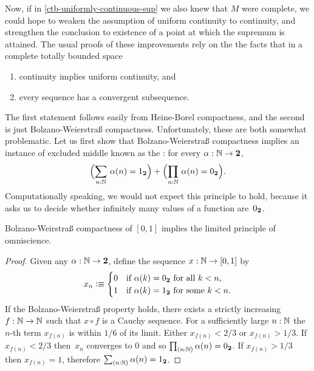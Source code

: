 Now, if in \autoref{ctb-uniformly-continuous-sup} we also knew that $M$ were complete, we
could hope to weaken the assumption of uniform continuity to continuity, and strengthen
the conclusion to existence of a point at which the supremum is attained. The usual proofs
of these improvements rely on the the facts that in a complete totally bounded space
%
\begin{enumerate}
\item continuity implies uniform continuity, and
\item every sequence has a convergent subsequence.
\end{enumerate}
%
The first statement follows easily from Heine-Borel compactness, and the second is just
Bolzano-Weierstra\ss{} compactness.
%
Unfortunately, these are both somewhat problematic. Let
us first show that Bolzano-Weierstra\ss{} compactness implies an instance of excluded middle
known as the :
%
%
for every $\alpha : \mathbb{N} \to \mathbf{2}$,
% 
\begin{equation} \label{eq:lpo}
  \Parens{\sm{n : \N} \alpha(n) = \btrue} +
  \Parens{\prd{n : \N} \alpha(n) = \bfalse}.
\end{equation}
%
Computationally speaking, we would not expect this principle to hold, because it asks us to decide
whether infinitely many values of a function are~${0_{\mathbf{2}}}$.
  
\begin{thm} \label{analysis-bw-lpo}
  Bolzano-Weirstra\ss{} compactness of $[0,1]$ implies the limited principle of omniscience.
\end{thm}

\begin{proof}
  Given any $\alpha : \mathbb{N} \to \mathbf{2}$, define the sequence $x : \mathbb{N} \to [0,1]$ by
  \begin{equation*}
    x_n \vcentcolon\equiv
    \begin{cases}
      0 & \text{if $\alpha(k) = {0_{\mathbf{2}}}$ for all $k < n$,}\\
      1 & \text{if $\alpha(k) = {1_{\mathbf{2}}}$ for some $k < n$}.
    \end{cases}
  \end{equation*}
  If the Bolzano-Weierstra\ss{} property holds, there exists a strictly increasing $f : \mathbb{N} \to
  \mathbb{N}$ such that $x \circ f$ is a Cauchy sequence. For a sufficiently large $n :
  \mathbb{N}$ the $n$-th term $x_{f(n)}$ is within $1/6$ of its limit. Either $x_{f(n)} < 2/3$ or
  $x_{f(n)} > 1/3$. If $x_{f(n)} < 2/3$ then~$x_n$ converges to $0$ and so $\prd{n : \N}
  \alpha(n) = \bfalse$. If $x_{f(n)} > 1/3$ then $x_{f(n)} = 1$, therefore $\sm{n : \N}
  \alpha(n) = \btrue$.
\end{proof}


